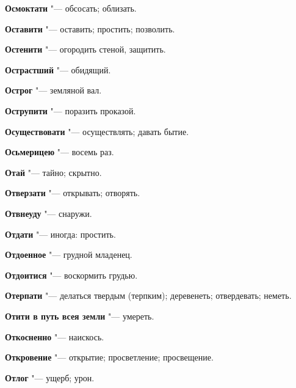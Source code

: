 \begin{mymulticols}{2}
\noindent\textbf{Осмоктати} "--- обсосать; облизать. 




\noindent\textbf{Оставити} "--- оставить; простить; позволить. 




\noindent\textbf{Остенити} "--- огородить стеной, защитить. 




\noindent\textbf{Острастший} "--- обидящий. 




\noindent\textbf{Острог} "--- земляной вал. 




\noindent\textbf{Острупити} "--- поразить проказой. 




\noindent\textbf{Осуществовати} "--- осуществлять; давать бытие. 




\noindent\textbf{Осьмерицею} "--- восемь раз. 




\noindent\textbf{Отай} "--- тайно; скрытно. 




\noindent\textbf{Отверзати} "--- открывать; отворять. 




\noindent\textbf{Отвнеуду} "--- снаружи. 




\noindent\textbf{Отдати} "--- иногда: простить. 




\noindent\textbf{Отдоенное} "--- грудной младенец. 




\noindent\textbf{Отдоитися} "--- воскормить грудью. 




\noindent\textbf{Отерпати} "--- делаться твердым (терпким); деревенеть; отвердевать; неметь. 




\noindent\textbf{Отити в путь всея земли} "--- умереть. 




\noindent\textbf{Откосненно} "--- наискось. 




\noindent\textbf{Откровение} "--- открытие; просветление; просвещение. 




\noindent\textbf{Отлог} "--- ущерб; урон. 





\end{mymulticols}
